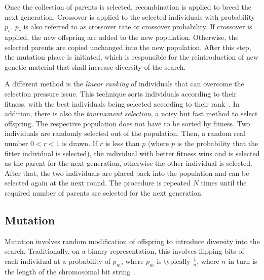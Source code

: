 \documentclass[paper=a4,%
  twoside,%
  BCOR4mm,%
  abstract=true,%
  toc=bibliography,%
  chapterprefix=true,%
  toc=bibliographynumbered,%
  open=right,%
  english,%
  pagesize=pdftex]{scrreprt}
\begin{document}
Once the collection of parents is selected, recombination is applied to breed the next generation. Crossover is applied to the selected individuals with probability $p_c$. $p_c$ is also referred to as crossover rate or crossover probability. If crossover is applied, the new offspring are added to the new population. Otherwise, the selected parents are copied unchanged into the new population. After this step, the mutation phase is initiated, which is responsible for the reintroduction of new genetic material that shall increase diversity of the search.

A different method is the \textit{linear ranking} of individuals that can overcome the selection pressure issue. This technique sorts individuals according to their fitness, with the best individuals being selected according to their rank~\cite{whitley1989genitor}. In addition, there is also the \textit{tournament selection}, a noisy but fast method to select offspring. The respective population does not have to be sorted by fitness. Two individuals are randomly selected out of the population. Then, a random real number $0 < r < 1$ is drawn. If $r$ is less than $p$ (where $p$ is the probability that the fitter individual is selected), the individual with better fitness wins and is selected as the parent for the next generation, otherwise the other individual is selected. After that, the two individuals are placed back into the population and can be selected again at the next round. The procedure is repeated $N$ times until the required number of parents are selected for the next generation.

\subsection{Mutation}
Mutation involves random modification of offspring to introduce diversity into the search. Traditionally, on a binary representation, this involves flipping bits of each individual at a probability of $p_m$, where $p_m$ is typically $\frac{1}{n}$, where $n$ in turn is the length of the chromosomal bit string~\cite{Harman2010a}. 
\end{document}
